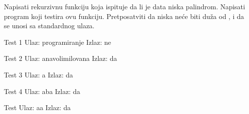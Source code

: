 \begin{Exercise}[label=113]
Napisati rekurzivnu funkciju koja ispituje da li je data niska
  palindrom. Napisati program koji testira ovu funkciju. Pretposatviti
  da niska neće biti duža od , i da se unosi sa standardnog
  ulaza.
  
\begin{miditest}
\begin{test}{Test 1}
Ulaz:    programiranje    
Izlaz:   ne                   
\end{test}
\end{miditest}
\begin{miditest}
\begin{test}{Test 2}
Ulaz:    anavolimilovana 
Izlaz:   da                   
\end{test}
\end{miditest}

\begin{minitest}
\begin{test}{Test 3}
Ulaz:    a        
Izlaz:   da 
\end{test}
\end{minitest}
\begin{minitest}
\begin{test}{Test 4}
Ulaz:    aba   
Izlaz:   da 
\end{test}
\end{minitest}
\begin{minitest}
\begin{test}{Test }
Ulaz:    aa
Izlaz:   da 
\end{test}
\end{minitest}
\end{Exercise}
\begin{Answer}[ref=113]
\end{Answer}


